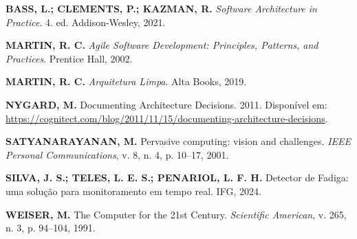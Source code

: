 \documentclass[12pt]{article}
\begin{document}
\noindent \textbf{BASS, L.; CLEMENTS, P.; KAZMAN, R.} \textit{Software Architecture in Practice}. 4. ed. Addison-Wesley, 2021.

\noindent \textbf{MARTIN, R. C.} \textit{Agile Software Development: Principles, Patterns, and Practices}. Prentice Hall, 2002.

\noindent \textbf{MARTIN, R. C.} \textit{Arquitetura Limpa}. Alta Books, 2019.

\noindent \textbf{NYGARD, M.} Documenting Architecture Decisions. 2011. Disponível em: \url{https://cognitect.com/blog/2011/11/15/documenting-architecture-decisions}.

\noindent \textbf{SATYANARAYANAN, M.} Pervasive computing: vision and challenges. \textit{IEEE Personal Communications}, v. 8, n. 4, p. 10--17, 2001.

\noindent \textbf{SILVA, J. S.; TELES, L. E. S.; PENARIOL, L. F. H.} Detector de Fadiga: uma solução para monitoramento em tempo real. IFG, 2024.

\noindent \textbf{WEISER, M.} The Computer for the 21st Century. \textit{Scientific American}, v. 265, n. 3, p. 94--104, 1991.
\end{document}
